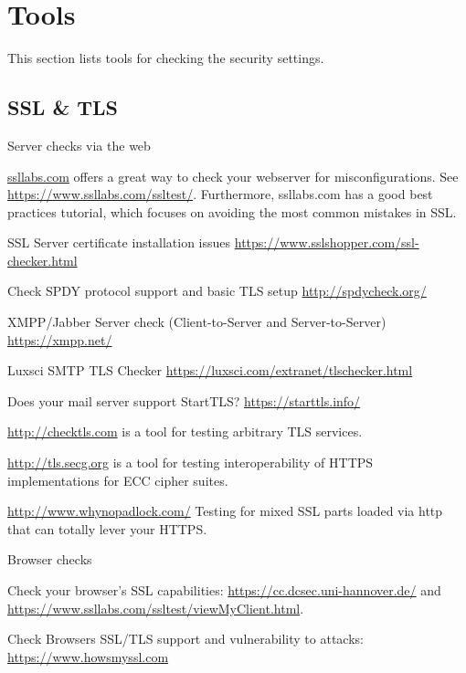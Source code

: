 \chapter{Tools}
\label{cha:tools}
This section lists tools for checking the security settings.

\section{SSL \& TLS}

Server checks via the web
\begin{itemize*}
  \item \href{https://ssllabs.com}{ssllabs.com} offers a great way to check your webserver for misconfigurations. See \url{https://www.ssllabs.com/ssltest/}. Furthermore, ssllabs.com has a good best practices tutorial, which focuses on avoiding the most common mistakes in SSL.
  \item SSL Server certificate installation issues \url{https://www.sslshopper.com/ssl-checker.html}
  \item Check SPDY protocol support and basic TLS setup \url{http://spdycheck.org/}
  \item XMPP/Jabber Server check (Client-to-Server and Server-to-Server) \url{https://xmpp.net/}
  \item Luxsci SMTP TLS Checker \url{https://luxsci.com/extranet/tlschecker.html}
  \item Does your mail server support StartTLS? \url{https://starttls.info/}
  \item \url{http://checktls.com} is a tool for testing arbitrary TLS services.
  \item \url{http://tls.secg.org} is a tool for testing interoperability of HTTPS implementations for ECC cipher suites.
  \item \url{http://www.whynopadlock.com/} Testing for mixed SSL parts loaded via http that can totally lever your HTTPS.
\end{itemize*}

Browser checks
\begin{itemize*}
  \item Check your browser's SSL capabilities: \url{https://cc.dcsec.uni-hannover.de/} and \url{https://www.ssllabs.com/ssltest/viewMyClient.html}.
  \item Check Browsers SSL/TLS support and vulnerability to attacks: \url{https://www.howsmyssl.com}
\end{itemize*}


